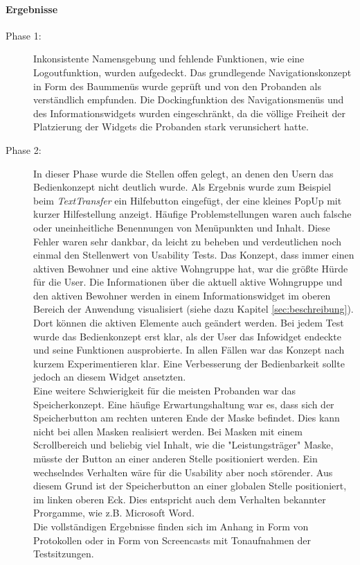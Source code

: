 \paragraph*{Ergebnisse}
\begin{description}

\item[Phase 1:] Inkonsistente Namensgebung und fehlende Funktionen, wie eine Logoutfunktion, wurden aufgedeckt. Das grundlegende Navigationskonzept in Form des Baummenüs wurde geprüft und von den Probanden als verständlich empfunden. Die Dockingfunktion des Navigationsmenüs und des Informationswidgets wurden eingeschränkt, da die völlige Freiheit der Platzierung der Widgets die Probanden stark verunsichert hatte. 

\item[Phase 2:] In dieser Phase wurde die Stellen offen gelegt, an denen den Usern das Bedienkonzept nicht deutlich wurde.
Als Ergebnis wurde zum Beispiel beim \textit{TextTransfer} ein Hilfebutton eingefügt, der eine kleines PopUp mit kurzer Hilfestellung anzeigt.
Häufige Problemstellungen waren auch falsche oder uneinheitliche Benennungen von Menüpunkten und Inhalt. Diese Fehler waren sehr dankbar, da leicht zu beheben und verdeutlichen noch einmal den Stellenwert von Usability Tests. Das Konzept, dass \EBP immer einen aktiven Bewohner und eine aktive Wohngruppe hat, war die größte Hürde für die User.
Die Informationen über die aktuell aktive Wohngruppe und den aktiven Bewohner werden in einem Informationswidget im oberen Bereich der Anwendung visualisiert (siehe dazu Kapitel \ref{sec:beschreibung}). Dort können die aktiven Elemente auch geändert werden. Bei jedem Test wurde das Bedienkonzept erst klar, als der User das Infowidget endeckte und seine Funktionen  ausprobierte. In allen Fällen war das 
Konzept nach kurzem Experimentieren klar. Eine Verbesserung der Bedienbarkeit sollte jedoch an diesem Widget ansetzten.\\
Eine weitere Schwierigkeit für die meisten Probanden war das Speicherkonzept. Eine häufige Erwartungshaltung war es, dass sich der Speicherbutton am rechten unteren Ende der Maske befindet. Dies kann nicht bei allen Masken realisiert werden. Bei Masken mit einem Scrollbereich und beliebig viel Inhalt, wie die "Leistungsträger" Maske, müsste der Button an einer anderen Stelle positioniert werden. Ein wechselndes Verhalten wäre für die Usability aber noch störender. Aus diesem Grund ist der Speicherbutton an einer globalen Stelle positioniert, im linken oberen Eck. Dies entspricht auch dem Verhalten bekannter Prorgamme, wie z.B. Microsoft Word.\\
Die vollständigen Ergebnisse finden sich im Anhang in Form von Protokollen oder in Form von Screencasts mit Tonaufnahmen der Testsitzungen.

\end{description}


